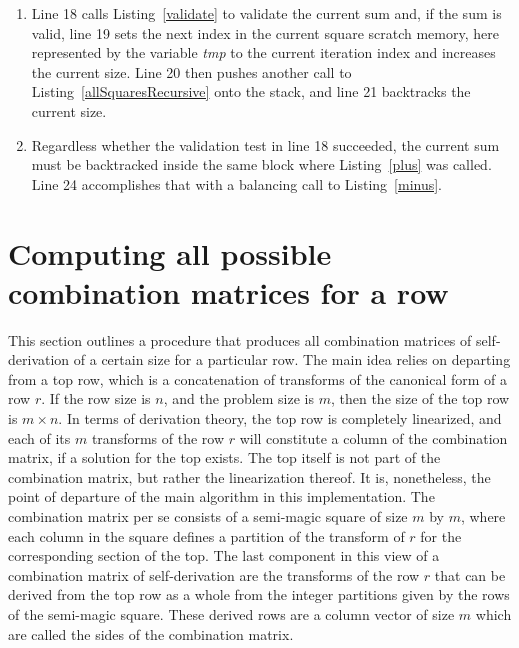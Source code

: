 \begin{enumerate}
\addtocounter{enumi}{3}
\item Line 18 calls Listing~\ref{validate} to validate the current sum and, if the sum is valid, line 19 sets the next index in the current square scratch memory, here represented by the variable \emph{tmp} to the current iteration index and increases the current size. Line 20 then pushes another call to Listing~\ref{allSquaresRecursive} onto the stack, and line 21 backtracks the current size.
\addtocounter{enumi}{5}
\item Regardless whether the validation test in line 18 succeeded, the current sum must be backtracked inside the same block where Listing~\ref{plus} was called. Line 24 accomplishes that with a balancing call to Listing~\ref{minus}.
\end{enumerate}

\section{Computing all possible combination matrices for a row}

This section outlines a procedure that produces all combination matrices of self-derivation of a certain size for a particular row. The main idea relies on departing from a top row, which is a concatenation of transforms of the canonical form of a row $r$. If the row size is $n$, and the problem size is $m$, then the size of the top row is $m \times n$. In terms of derivation theory, the top row is completely linearized, and each of its $m$ transforms of the row $r$ will constitute a column of the combination matrix, if a solution for the top exists. The top itself is not part of the combination matrix, but rather the linearization thereof. It is, nonetheless, the point of departure of the main algorithm in this implementation. The combination matrix per se consists of a semi-magic square of size $m$ by $m$, where each column in the square defines a partition of the transform of $r$ for the corresponding section of the top. The last component in this view of a combination matrix of self-derivation are the transforms of the row $r$ that can be derived from the top row as a whole from the integer partitions given by the rows of the semi-magic square. These derived rows are a column vector of size $m$ which are called the sides of the combination matrix.

